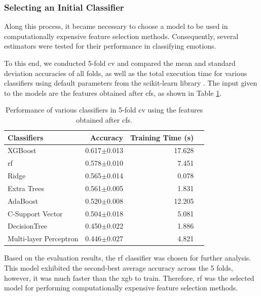 \subsubsection{Selecting an Initial Classifier}

Along this process, it became necessary to choose a model to be used in computationally expensive feature selection methods. Consequently, several estimators were tested for their performance in classifying emotions.

To this end, we conducted 5-fold \ac{cv} and compared the mean and standard deviation accuracies of all folds, as well as the total execution time for various classifiers using default parameters from the scikit-learn library \cite{pedregosa2011scikit}. The input given to the models are the features obtained after \ac{cfs}, as shown in Table \ref{tab:modelsPerformance}.

\begin{table}[H]
	\caption{Performance of various classifiers in 5-fold \ac{cv} using the features obtained after \ac{cfs}.}
	\centering
	\label{tab:modelsPerformance}
	\begin{tabular}{lrrr}
		\toprule
		Classifiers &  Accuracy & Training Time (s) \\
		\midrule
		XGBoost                &        0.617$\pm$0.013  & 17.628 \\
		\ac{rf}                &        0.578$\pm$0.010  &  7.451 \\
		Ridge                  &        0.565$\pm$0.014  &  0.078 \\
		Extra Trees            &        0.561$\pm$0.005  &  1.831  \\
		AdaBoost               &        0.520$\pm$0.008  & 12.205  \\
		C-Support Vector       &        0.504$\pm$0.018  &  5.081 \\
		DecisionTree           &        0.450$\pm$0.022  &  1.886 \\
		Multi-layer Perceptron &        0.446$\pm$0.027  &  4.821 \\
		\bottomrule
	\end{tabular}
\end{table}

Based on the evaluation results, the \ac{rf} classifier was chosen for further analysis. This model exhibited the second-best average accuracy across the 5 folds, however, it was much faster than the \ac{xgb} to train. Therefore, \ac{rf} was the selected model for performing computationally expensive feature selection methods.


